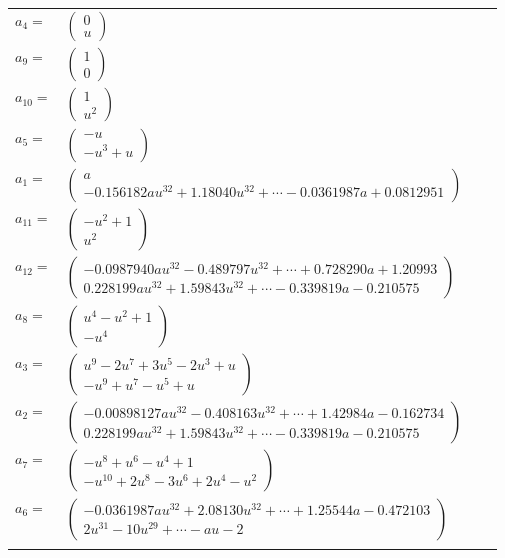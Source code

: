 \documentclass[1p]{elsarticle_modified}
\theoremstyle{definition}
\begin{document}
\begin{tabular}{m{7pt} m{180pt} m{7pt} m{180pt} }
\flushright $a_{4}=$&$\begin{pmatrix}0\\u\end{pmatrix}$ \\
\flushright $a_{9}=$&$\begin{pmatrix}1\\0\end{pmatrix}$ \\
\flushright $a_{10}=$&$\begin{pmatrix}1\\u^2\end{pmatrix}$ \\
\flushright $a_{5}=$&$\begin{pmatrix}- u\\- u^3+u\end{pmatrix}$ \\
\flushright $a_{1}=$&$\begin{pmatrix}a\\-0.156182 a u^{32}+1.18040 u^{32}+\cdots-0.0361987 a+0.0812951\end{pmatrix}$ \\
\flushright $a_{11}=$&$\begin{pmatrix}- u^2+1\\u^2\end{pmatrix}$ \\
\flushright $a_{12}=$&$\begin{pmatrix}-0.0987940 a u^{32}-0.489797 u^{32}+\cdots+0.728290 a+1.20993\\0.228199 a u^{32}+1.59843 u^{32}+\cdots-0.339819 a-0.210575\end{pmatrix}$ \\
\flushright $a_{8}=$&$\begin{pmatrix}u^4- u^2+1\\- u^4\end{pmatrix}$ \\
\flushright $a_{3}=$&$\begin{pmatrix}u^9-2 u^7+3 u^5-2 u^3+u\\- u^9+u^7- u^5+u\end{pmatrix}$ \\
\flushright $a_{2}=$&$\begin{pmatrix}-0.00898127 a u^{32}-0.408163 u^{32}+\cdots+1.42984 a-0.162734\\0.228199 a u^{32}+1.59843 u^{32}+\cdots-0.339819 a-0.210575\end{pmatrix}$ \\
\flushright $a_{7}=$&$\begin{pmatrix}- u^8+u^6- u^4+1\\- u^{10}+2 u^8-3 u^6+2 u^4- u^2\end{pmatrix}$ \\
\flushright $a_{6}=$&$\begin{pmatrix}-0.0361987 a u^{32}+2.08130 u^{32}+\cdots+1.25544 a-0.472103\\2 u^{31}-10 u^{29}+\cdots- a u-2\end{pmatrix}$\\&\end{tabular}
\end{document}
